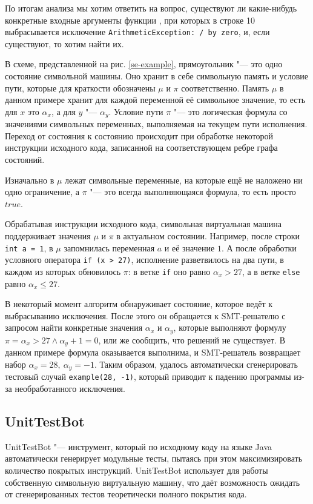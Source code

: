 По итогам анализа мы хотим ответить на вопрос, существуют ли какие-нибудь конкретные входные аргументы функции , при которых в строке 10 выбрасывается исключение \verb|ArithmeticException: / by zero|, и, если существуют, то хотим найти их.

В схеме, представленной на рис. \ref{se-example}, прямоугольник "--- это одно состояние символьной машины. Оно хранит в себе символьную память и условие пути, которые для краткости обозначены $\mu$ и $\pi$ соответственно. Память $\mu$ в данном примере хранит для каждой переменной её символьное значение, то есть для $x$ это $\alpha_x$, а для $y$ "--- $\alpha_y$. Условие пути $\pi$ "--- это логическая формула со значениями символьных переменных, выполняемая на текущем пути исполнения. Переход от состояния к состоянию происходит при обработке некоторой инструкции исходного кода, записанной на соответствующем ребре графа состояний.

Изначально в $\mu$ лежат символьные переменные, на которые ещё не наложено ни одно ограничение, а $\pi$ "--- это всегда выполняющаяся формула, то есть просто $true$.

Обрабатывая инструкции исходного кода, символьная виртуальная машина поддерживает значения $\mu$ и $\pi$ в актуальном состоянии. Например, после строки \verb|int a = 1|, в $\mu$ запомнилась переменная $a$ и её значение $1$. А после обработки условного оператора \verb|if (x > 27)|, исполнение разветвилось на два пути, в каждом из которых обновилось $\pi$: в ветке \verb|if| оно равно $\alpha_x > 27$, а в ветке \verb|else| равно $\alpha_x \le 27$.

В некоторый момент алгоритм обнаруживает состояние, которое ведёт к выбрасыванию исключения. После этого он обращается к SMT-решателю с запросом найти конкретные значения $\alpha_x$ и $\alpha_y$, которые выполняют формулу $\pi = \alpha_x > 27 \land \alpha_y + 1 = 0$, или же сообщить, что решений не существует. В данном примере формула оказывается выполнима, и SMT-решатель возвращает набор $\alpha_x = 28, ~\alpha_y = -1$. Таким образом, удалось автоматически сгенерировать тестовый случай \verb|example(28, -1)|, который приводит к падению программы из-за необработанного исключения.

\newpage

\subsection{UnitTestBot}

UnitTestBot "--- инструмент, который по исходному коду на языке Java автоматически генерирует модульные тесты, пытаясь при этом максимизировать количество покрытых инструкций. UnitTestBot использует для работы собственную символьную виртуальную машину, что даёт возможность ожидать от сгенерированных тестов теоретически полного покрытия кода.

